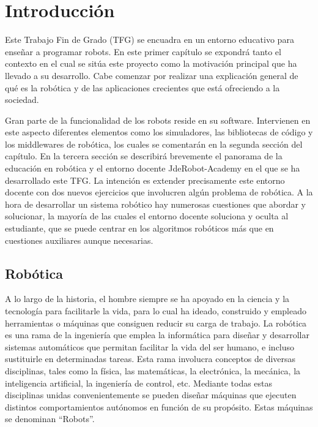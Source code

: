 \chapter{Introducción}\label{cap.introduccion}
Este Trabajo Fin de Grado (TFG) se encuadra en un entorno educativo para enseñar a programar robots. En este primer capítulo se expondrá tanto el contexto en el cual se sitúa este proyecto como la motivación principal que ha llevado a su desarrollo. Cabe comenzar por realizar una explicación general de qué es la robótica y de las aplicaciones crecientes que está ofreciendo a la sociedad. 

Gran parte de la funcionalidad de los robots reside en su software. Intervienen en este aspecto diferentes elementos como los simuladores, las bibliotecas de código y los middlewares de robótica, los cuales se comentarán en la segunda sección del capítulo. En la tercera sección se describirá brevemente el panorama de la educación en robótica y el entorno docente JdeRobot-Academy en el que se ha desarrollado este TFG. La intención es extender precisamente este entorno docente con dos nuevos ejercicios que involucren algún problema de robótica. A la hora de desarrollar un sistema robótico hay numerosas cuestiones que abordar y solucionar,  la mayoría de las cuales el entorno docente soluciona y oculta al estudiante, que se puede centrar en los algoritmos robóticos más que en cuestiones auxiliares aunque necesarias.

\section{Robótica}
A lo largo de la historia, el hombre siempre se ha apoyado en la ciencia y la tecnología para facilitarle la vida, para lo cual ha ideado, construido y empleado herramientas o máquinas que consiguen reducir su carga de trabajo. La robótica es una rama de la ingeniería que emplea la informática para diseñar y desarrollar sistemas automáticos que permitan facilitar la vida del ser humano, e incluso sustituirle en determinadas tareas. Esta rama involucra conceptos de diversas disciplinas, tales como la física, las matemáticas, la electrónica, la mecánica, la inteligencia artificial, la ingeniería de control, etc. Mediante todas estas disciplinas unidas convenientemente se pueden diseñar máquinas que ejecuten distintos comportamientos autónomos en función de su propósito. Estas máquinas se denominan “Robots”.


